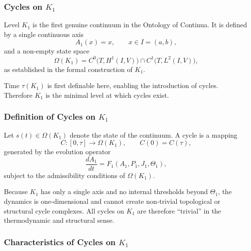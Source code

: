 
\subsubsection{Cycles on \texorpdfstring{$K_1$}{K_1}}
\label{sec:cycles-k1}

Level $K_1$ is the first genuine continuum in the Ontology of
Continua.
It is defined by a single continuous axis
\[
  A_1(x)=x, \qquad x\in I=(a,b),
\]
and a non-empty state space
\[
  \Omega(K_1)
  = C^0\!\bigl(T, H^1(I,V)\bigr)
    \cap C^1\!\bigl(T, L^2(I,V)\bigr),
\]
as established in the formal construction of $K_1$.

Time $\tau(K_1)$ is first definable here, enabling the introduction of
cycles.
Therefore $K_1$ is the minimal level at which cycles exist.

\subsubsection{Definition of Cycles on \texorpdfstring{$K_1$}{K_1}}

Let $s(t)\in\Omega(K_1)$ denote the state of the continuum.
A cycle is a mapping
\[
  C:[0,\tau]\to\Omega(K_1), \qquad
  C(0)=C(\tau),
\]
generated by the evolution operator
\[
  \frac{dA_1}{dt} = F_1(A_1,P_1,J_1,\Theta_1),
\]
subject to the admissibility conditions of $\Omega(K_1)$.

Because $K_1$ has only a single axis and no internal thresholds beyond
$\Theta_1$, the dynamics is one-dimensional and cannot create
non-trivial topological or structural cycle complexes.
All cycles on $K_1$ are therefore ``trivial'' in the thermodynamic and
structural sense.

\subsubsection{Characteristics of Cycles on \texorpdfstring{$K_1$}{K_1}}

